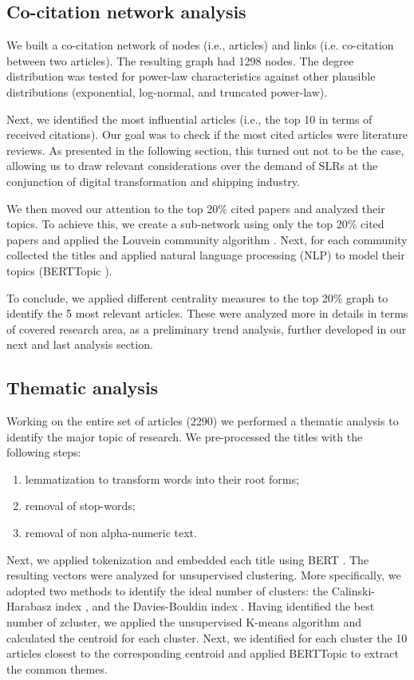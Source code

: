 \documentclass[a4paper, review, endfloat, authoryear]{elsarticle}
\begin{document}
	\subsection{Co-citation network analysis}
	We built a co-citation network of nodes (i.e., articles) and links (i.e. co-citation between two articles). The resulting graph had 1298 nodes. The degree distribution was tested for power-law characteristics against other plausible distributions (exponential, log-normal, and truncated power-law).
	
	Next, we identified the most influential articles (i.e., the top 10 in terms of received citations). Our goal was to check if the most cited articles were literature reviews. As presented in the following section, this turned out not to be the case, allowing us to draw relevant considerations over the demand of SLRs at the conjunction of digital transformation and shipping industry.
	
	We then moved our attention to the top 20\% cited papers and analyzed their topics. To achieve this, we create a sub-network using only the top 20\% cited papers and applied the Louvein community algorithm \citep{blondel2008fast}. Next, for each community collected the titles and applied natural language processing (NLP) to model their topics (BERTTopic \citep{paulcombining}).
	
	To conclude, we applied different centrality measures to the top 20\% graph to identify the 5 most relevant articles. These were analyzed more in details in terms of covered research area, as a preliminary trend analysis, further developed in our next and last analysis section.
	
	\subsection{Thematic analysis}
	Working on the entire set of articles (2290) we performed a thematic analysis to identify the major topic of research. We pre-processed the titles with the following steps:
	\begin{enumerate}
		\item lemmatization to transform words into their root forms;
		\item removal of stop-words;
		\item removal of non alpha-numeric text.
	\end{enumerate}
	Next, we applied tokenization and embedded each title using BERT \citep{devlin2018bert}. The resulting vectors were analyzed for unsupervised clustering. More specifically, we adopted two methods to identify the ideal number of clusters: the Calinski-Harabasz index \citep{calinski1974dendrite}, and the Davies-Bouldin index \citep{davies1979cluster}.
	Having identified the best number of zcluster, we applied the unsupervised K-means algorithm and calculated the centroid for each cluster.
	Next, we identified for each cluster the 10 articles closest to the corresponding centroid and applied BERTTopic to extract the common themes.
	
\end{document}

